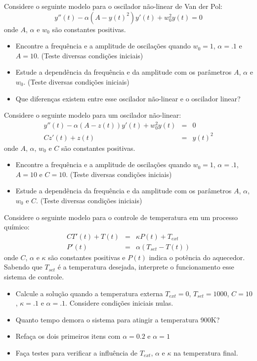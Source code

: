 \begin{exer} Considere o seguinte modelo para o oscilador não-linear de Van der Pol:
$$y''(t) - \alpha (A-y(t)^2)y'(t) + w_0^2y(t)=0$$
onde $A$, $\alpha$ e $w_0$ são constantes positivas.
\begin{itemize}
\item Encontre a frequência e a amplitude de oscilações quando $w_0=1$, $\alpha=.1$ e $A=10$. (Teste diversas condições iniciais)
\item Estude a dependência da frequência e da amplitude com os parâmetros  $A$, $\alpha$ e $w_0$. (Teste diversas condições iniciais)
\item Que diferenças existem entre esse oscilador não-linear e o oscilador linear?
\end{itemize}
\end{exer}

\begin{exer} Considere o seguinte modelo para um oscilador não-linear:
\begin{eqnarray*}
y''(t)-\alpha(A-z(t))y'(t)+w_0^2 y(t)&=&0\\
Cz'(t)+z(t)&=&y(t)^2
\end{eqnarray*}
onde $A$, $\alpha$, $w_0$ e $C$ são constantes positivas.
\begin{itemize}
\item Encontre a frequência e a amplitude de oscilações quando $w_0=1$, $\alpha=.1$, $A=10$ e $C=10$. (Teste diversas condições iniciais)
\item Estude a dependência da frequência e da amplitude com os parâmetros  $A$, $\alpha$, $w_0$ e $C$. (Teste diversas condições iniciais)
\end{itemize}
\end{exer}

\begin{exer} Considere o seguinte modelo para o controle de temperatura em um processo químico:
\begin{eqnarray*}
CT'(t)+T(t)&=&\kappa P(t)+T_{ext}\\
P'(t)&=&\alpha(T_{set}-T(t))
\end{eqnarray*}
onde $C$, $\alpha$ e $\kappa$ são constantes positivas e $P(t)$ indica o potência do aquecedor. Sabendo que $T_{set}$ é a temperatura desejada, interprete o funcionamento esse sistema de controle.
\begin{itemize}
\item Calcule a solução quando a temperatura externa $T_{ext}=0$, $T_{set}=1000$, $C=10$, $\kappa=.1$ e $\alpha=.1$. Considere condições iniciais nulas.
\item Quanto tempo demora o sistema para atingir a temperatura 900K?
\item Refaça os dois primeiros itens com $\alpha=0.2$ e $\alpha=1$
\item Faça testes para verificar a influência de $T_{ext}$, $\alpha$ e $\kappa$ na temperatura final.
\end{itemize}
\end{exer}

